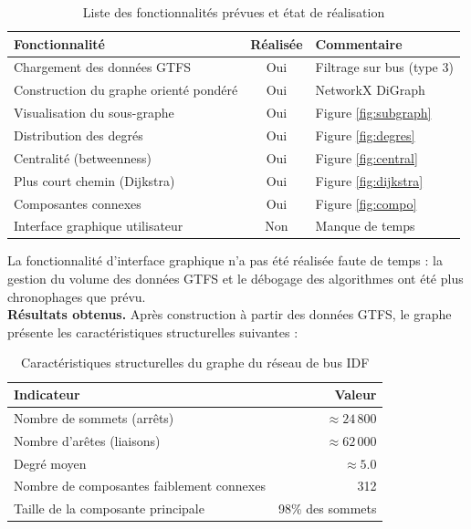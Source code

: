 \documentclass[a4paper, 12pt, twoside]{article}
\begin{document}
\begin{table}[h]
\begin{center}
\begin{tabular}{|p{7cm}|c|p{4.5cm}|}
\hline
\textbf{Fonctionnalité} & \textbf{Réalisée} & \textbf{Commentaire} \\
\hline
Chargement des données GTFS             & Oui & Filtrage sur bus (type 3) \\
Construction du graphe orienté pondéré  & Oui & NetworkX DiGraph \\
Visualisation du sous-graphe            & Oui & Figure \ref{fig:subgraph} \\
Distribution des degrés                 & Oui & Figure \ref{fig:degres} \\
Centralité (betweenness)                & Oui & Figure \ref{fig:central} \\
Plus court chemin (Dijkstra)            & Oui & Figure \ref{fig:dijkstra} \\
Composantes connexes                    & Oui & Figure \ref{fig:compo} \\
Interface graphique utilisateur         & Non & Manque de temps \\
\hline
\end{tabular}
\end{center}
\caption{Liste des fonctionnalités prévues et état de réalisation}
\label{tab:fonc}
\end{table}

La fonctionnalité d'interface graphique n'a pas été réalisée faute de temps : la gestion du volume des données GTFS et le débogage des algorithmes ont été plus chronophages que prévu.\\

\noindent\textbf{Résultats obtenus.} Après construction à partir des données GTFS, le graphe présente les caractéristiques structurelles suivantes :

\begin{table}[h]
\begin{center}
\begin{tabular}{|l|r|}
\hline
\textbf{Indicateur} & \textbf{Valeur} \\
\hline
Nombre de sommets (arrêts)                & $\approx 24\,800$ \\
Nombre d'arêtes (liaisons)                & $\approx 62\,000$ \\
Degré moyen                               & $\approx 5.0$     \\
Nombre de composantes faiblement connexes & 312               \\
Taille de la composante principale        & 98\% des sommets  \\
\hline
\end{tabular}
\end{center}
\caption{Caractéristiques structurelles du graphe du réseau de bus IDF}
\label{tab:stats}
\end{table}
\end{document}
